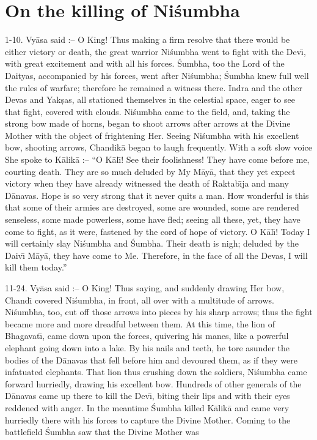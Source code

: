 \chapter{On the killing of Ni\'sumbha}

1-10. Vy\=asa said :-- O King! Thus making a firm resolve that there would be either victory or death, the great warrior Ni\'sumbha went to fight with the Dev\={\i}, with great excitement and with all his forces. \'Sumbha, too the Lord of the Daityas, accompanied by his forces, went after Ni\'sumbha; \'Sumbha knew full well the rules of warfare; therefore he remained a witness there. Indra and the other Devas and Yak\d{s}as, all stationed themselves in the celestial space, eager to see that fight, covered with clouds. Ni\'sumbha came to the field, and, taking the strong bow made of horns, began to shoot arrows after arrows at the Divine Mother with the object of frightening Her. Seeing Ni\'sumbha with his excellent bow, shooting arrows, Chandik\=a began to laugh frequently. With a soft slow voice She spoke to K\=alik\=a :-- ``O K\=al\={\i}! See their foolishness! They have come before me, courting death. They are so much deluded by My M\=ay\=a, that they yet expect victory when they have already witnessed the death of Raktab\={\i}ja and many D\=anavas. Hope is so very strong that it never quits a man. How wonderful is this that some of their armies are destroyed, some are wounded, some are rendered senseless, some made powerless, some have fled; seeing all these, yet, they have come to fight, as it were, fastened by the cord of hope of victory. O K\=al\={\i}! Today I will certainly slay Ni\'sumbha and \'Sumbha. Their death is nigh; deluded by the Daiv\={\i} M\=ay\=a, they have come to Me. Therefore, in the face of all the Devas, I will kill them today.''

11-24. Vy\=asa said :-- O King! Thus saying, and suddenly drawing Her bow, Chand\={\i} covered Ni\'sumbha, in front, all over with a multitude of arrows. Ni\'sumbha, too, cut off those arrows into pieces by his sharp arrows; thus the fight became more and more dreadful between them. At this time, the lion of Bhagavat\={\i}, came down upon the forces, quivering his manes, like a powerful elephant going down into a lake. By his nails and teeth, he tore asunder the bodies of the D\=anavas that fell before him and devoured them, as if they were infatuated elephants. That lion thus crushing down the soldiers, Ni\'sumbha came forward hurriedly, drawing his excellent bow. Hundreds of other generals of the D\=anavas came up there to kill the Dev\={\i}, biting their lips and with their eyes reddened with anger. In the meantime \'Sumbha killed K\=alik\=a and came very hurriedly there with his forces to capture the Divine Mother. Coming to the battlefield \'Sumbha saw that the Divine Mother was

